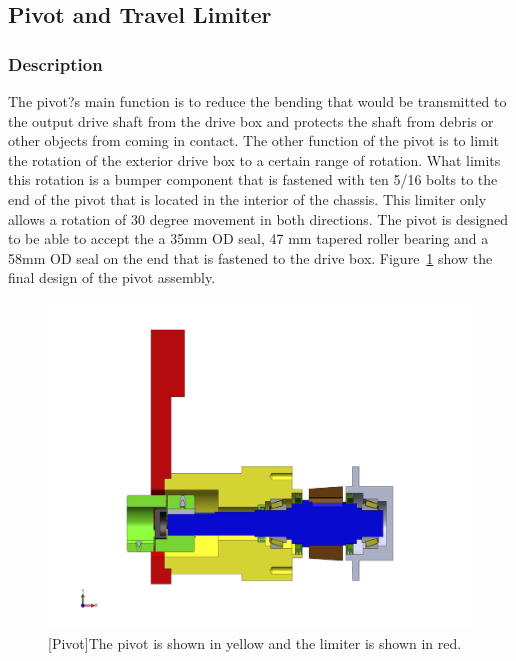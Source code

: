 \subsection{Pivot and Travel Limiter}

\subsubsection{Description}

The pivot?s main function is to reduce the bending that would be transmitted to the output drive shaft from the drive box and protects the shaft from debris or other objects from coming in contact. The other function of the pivot is to limit the rotation of the exterior drive box to a certain range of rotation. What limits this rotation is a bumper component that is fastened with ten 5/16\? bolts to the end of the pivot that is located in the interior of the chassis. This limiter only allows a rotation of 30 degree movement in both directions. The pivot is designed to be able to accept the a 35mm OD seal,  47 mm tapered roller bearing and a 58mm OD seal on the end that is fastened to the drive box. Figure~\ref{fig:pivot_assembly_drw} show the final design of the pivot assembly.

\begin{figure}[htbp]
\centering
\includegraphics[height=0.3\textheight]{./images/pivot_assembly_drw}
[Pivot]{The pivot is shown in yellow and the limiter is shown in red.}
\label{fig:pivot_assembly_drw}
\end{figure}


